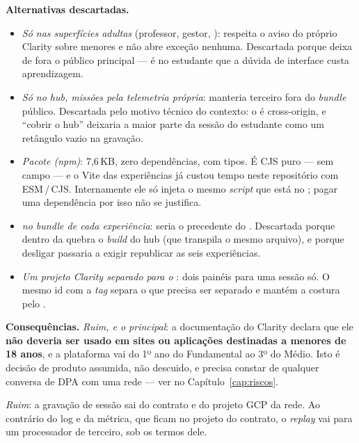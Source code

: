 \textbf{Alternativas descartadas.}
\begin{itemize}
  \item \emph{Só nas superfícies adultas} (professor, gestor,
    ): respeita o aviso do próprio Clarity sobre menores e
    não abre exceção nenhuma. Descartada porque deixa de fora o público
    principal --- é no estudante que a dúvida de interface custa aprendizagem.
  \item \emph{Só no hub, missões pela telemetria própria}: manteria terceiro
    fora do \emph{bundle} público. Descartada pelo motivo técnico do contexto:
    o  é cross-origin, e \enquote{cobrir o hub} deixaria a maior
    parte da sessão do estudante como um retângulo vazio na gravação.
  \item \emph{Pacote  (npm)}: 7,6\,KB, zero
    dependências, com tipos. É CJS puro --- sem campo  --- e o Vite
    das experiências já custou tempo neste repositório com ESM\,/\,CJS.
    Internamente ele só injeta o mesmo \emph{script} que está no
    ; pagar uma dependência por isso não se justifica.
  \item \emph{ no \emph{bundle} de cada
    experiência}: seria o precedente do .
    Descartada porque  dentro da  quebra o
    \emph{build} do hub (que transpila o mesmo arquivo), e porque desligar
    passaria a exigir republicar as seis experiências.
  \item \emph{Um projeto Clarity separado para o }: dois painéis
    para uma sessão só. O mesmo id com a \emph{tag}  separa o
    que precisa ser separado e mantém a costura pelo .
\end{itemize}

\textbf{Consequências.} \emph{Ruim, e o principal}: a documentação do Clarity
declara que ele \textbf{não deveria ser usado em sites ou aplicações destinadas
a menores de 18 anos}, e a plataforma vai do 1º ano do Fundamental ao 3º do
Médio. Isto é decisão de produto assumida, não descuido, e precisa constar de
qualquer conversa de DPA com uma rede --- ver  no
Capítulo~\ref{cap:riscos}.

\emph{Ruim}: a gravação de sessão sai do contrato e do projeto GCP da rede. Ao
contrário do log e da métrica, que ficam no projeto do contrato, o
\emph{replay} vai para um processador de terceiro, sob os termos dele.

